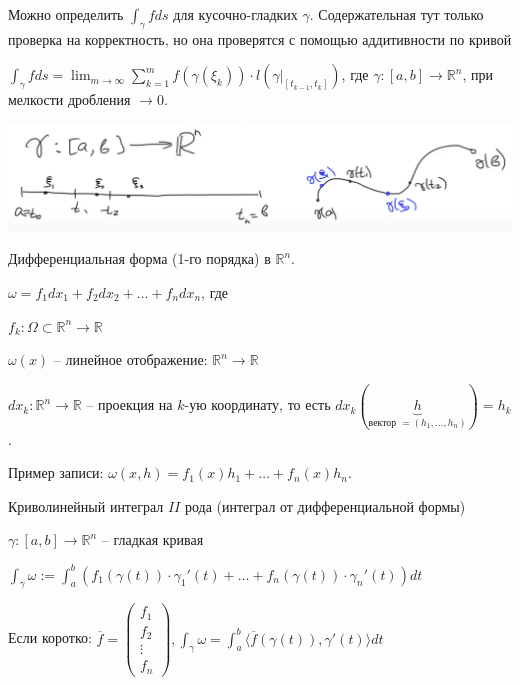 \begin{remark}
    Можно определить $\int_{\gamma}^{}f ds$ для кусочно-гладких $\gamma$. Содержательная тут только проверка на корректность, но она проверятся с помощью аддитивности по кривой 
\end{remark}

\begin{exerc}

    $\int_{\gamma}^{}f ds = \lim_{m \rightarrow \infty} \sum_{k = 1}^{m}f(\gamma(\xi_k)) \cdot l(\gamma|_{[t_{k - 1}, t_k]})$, где $\gamma: [a, b] \to \mathbb{R}^n$, при мелкости дробления $\to 0$.

    \begin{center}
        \includegraphics[width=15cm]{assets/03-intergrals-with-params/exercise-for-line.png}
    \end{center}
\end{exerc}

\begin{definition}
    Дифференциальная форма (1-го порядка) в $\mathbb{R}^n$.

    $\omega = f_1dx_1 + f_2dx_2 + \dots + f_ndx_n$, где

    $f_k: \Omega \subset \mathbb{R}^n \rightarrow \mathbb{R}$

    $\omega(x)$ -- линейное отображение: $\mathbb{R}^n \rightarrow \mathbb{R}$

    $dx_k: \mathbb{R}^n \rightarrow \mathbb{R}$ -- проекция на $k$-ую координату, то есть $dx_k(\underbrace{h}_{\text{вектор } = (h_1, \dots, h_n)}) = h_k$.

    Пример записи: $\omega(x, h) = f_1(x) h_1 + \dots + f_n(x) h_n$.
\end{definition}

\begin{definition}
    Криволинейный интеграл $II$ рода (интеграл от дифференциальной формы)

    $\gamma: [a, b] \to \mathbb{R}^n$ -- гладкая кривая

    $\int_{\gamma}^{}\omega := \int_{a}^{b}(f_1(\gamma(t))\cdot\gamma_1'(t) + \dots + f_n(\gamma(t))\cdot\gamma_n'(t))dt$

    Если коротко: $\overline{f} = \begin{pmatrix}
        f_1\\
        f_2\\
        \vdots\\
        f_n
    \end{pmatrix}, \int_{\gamma}^{}\omega = \int_{a}^{b}\langle \overline{f}(\gamma(t)), \gamma'(t)\rangle dt$
\end{definition}


